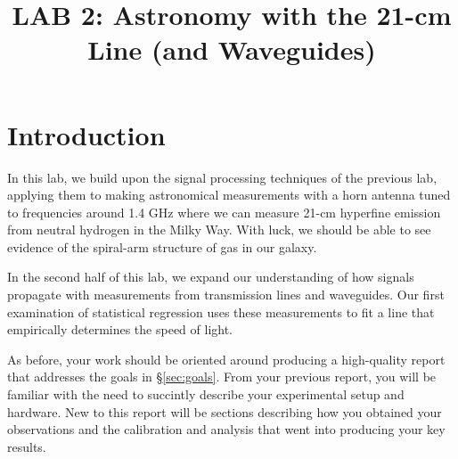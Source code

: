 \documentclass[11pt,preprint]{aastex}
\begin{document}
\def\simlt{\lower.5ex\hbox{$\; \buildrel < \over \sim \;$}}
\def\simgt{\lower.5ex\hbox{$\; \buildrel > \over \sim \;$}}

\title {LAB 2: Astronomy with the 21-cm Line (and Waveguides)}

\tableofcontents

\section{Introduction}

\noindent
In this lab, we build upon the signal processing techniques of the previous lab,
applying them to making astronomical measurements with a horn antenna
tuned to frequencies around 1.4 GHz where we can measure 21-cm hyperfine
emission from neutral hydrogen in the Milky Way.  With luck, we should be able
to see evidence of the spiral-arm structure of gas in our galaxy.

In the second half of this lab, we expand our understanding of how signals
propagate with measurements from transmission lines and waveguides. Our first examination
of statistical regression uses these measurements to fit a line that empirically
determines the speed of light.

As before, your work should be oriented around producing a high-quality report that
addresses the goals in \S\ref{sec:goals}. From your previous report, you will
be familiar with the need to succintly describe your experimental setup and hardware.
New to this report will be sections describing how you obtained your observations
and the calibration and analysis that went into producing your key results.
\end{document}
